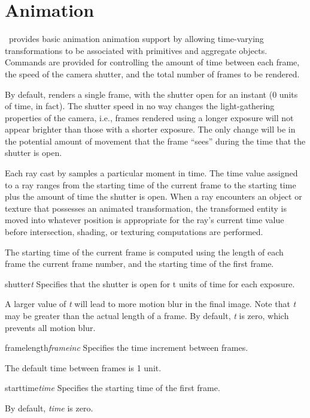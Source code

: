 \chapter{Animation}

{\Rayshade}\ provides basic animation animation support by
allowing time-varying
transformations to be associated with primitives and aggregate objects.
Commands are provided for controlling the amount of time between each
frame, the speed of the camera shutter, and the total number of frames
to be rendered.

By default, {\rayshade} renders a single frame, with the shutter open for
an instant (0 units of time, in fact).  The shutter speed in no way
changes the light-gathering properties of the camera, i.e., frames
rendered using
a longer exposure will not appear brighter than those with a shorter
exposure.  The only change will be in the potential amount of movement
that the
frame ``sees'' during the time that the shutter is open.

Each ray cast by {\rayshade} samples a particular moment in time.
The time value assigned to a ray
ranges from the starting time of the current frame to the starting
time plus the amount of time the shutter is open.  When
a ray encounters an object or texture that possesses an animated
transformation, the transformed
entity is moved into whatever position is appropriate
for the ray's current time value before intersection, shading, or texturing
computations are performed.

The starting time of the current frame is computed using the
length of each frame
the current frame number, and the starting time of the first frame.

\begin{defkey}{shutter}{{\em t}}
	Specifies that the shutter is open for t units of
	time for each exposure.
\end{defkey}
A larger value of {\em t} will lead to more motion blur in the final
image.   Note that {\em t} may be greater than the actual length
of a frame.  By default, {\em t} is zero, which prevents all motion blur.

\begin{defkey}{framelength}{{\em frameinc}}
	Specifies the time increment between frames.
\end{defkey}
The default time between frames is 1 unit.

\begin{defkey}{starttime}{{\em time}}
	Specifies the starting time of the first frame.
\end{defkey}
By default, {\em time} is zero.

